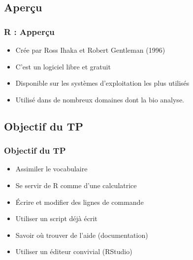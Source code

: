 \documentclass[table,svgnames,hyperref={pdfpagemode=FullScreen}]{beamer}
\begin{document}
\subsection{Aperçu}

\begin{frame}
	\frametitle{R : Apperçu}
	\begin{center}
		\begin{block}{}
			\begin{itemize}
				\item Crée par Ross Ihaka et Robert Gentleman (1996)
				\item C'est un logiciel libre et gratuit
				\item Disponible sur les systèmes d'exploitation les plus utilisés
				\item Utilisé dans de nombreux domaines dont la bio analyse.
			\end{itemize}
		\end{block}
	\end{center}
\end{frame}

\subsection{Objectif du TP}
\begin{frame}
	\frametitle{Objectif du TP}
		
	\begin{itemize}[<+->]
		\item {Assimiler le vocabulaire }
		\item {Se servir de R comme d'une calculatrice}
		\item {Écrire et modifier des lignes de commande}
		\item {Utiliser un script déjà écrit}
		\item {Savoir où trouver de l'aide (documentation)}
		\item {Utiliser un éditeur convivial (RStudio)}%
	\end{itemize}
\end{frame}
\end{document}
